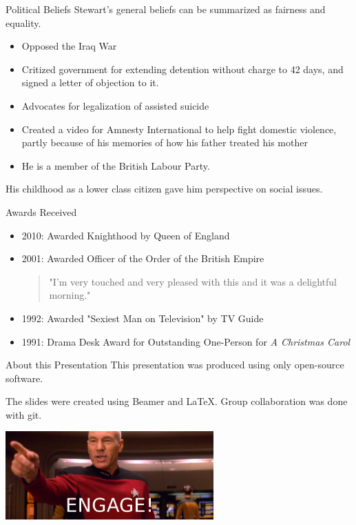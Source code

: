 \documentclass[xcolor=dvipsnames]{beamer}
\begin{document}
\begin{frame}{Political Beliefs}
  Stewart's general beliefs can be summarized as fairness and equality.  
  \begin{itemize}
    \item Opposed the Iraq War
    \item Critized government for extending detention without charge to 42
    days, and signed a letter of objection to it.
    \item Advocates for legalization of assisted suicide
    \item Created a video for Amnesty International to help fight domestic
    violence, partly because of his memories of how his father treated his
    mother
    \item He is a member of the British Labour Party.
  \end{itemize}
  His childhood as a lower class citizen gave him perspective on social issues.

\end{frame}

\begin{frame}{Awards Received}
  \begin{itemize}
    \item 2010: Awarded Knighthood by Queen of England
    \item 2001: Awarded Officer of the Order of the British Empire
      \begin{qct}
        \begin{quote}
          "I'm very touched and very pleased with this and it was a delightful
          morning."
        \end{quote}
      \end{qct}
    \item 1992: Awarded "Sexiest Man on Television" by TV Guide
    \item 1991: Drama Desk Award for Outstanding One-Person for \emph{A
    Christmas Carol}
  \end{itemize}
\end{frame}

\begin{frame}{About this Presentation}
  This presentation was produced using only open-source software.

  The slides were created using Beamer and LaTeX.
  Group collaboration was done with git.
  \begin{center}
    \includegraphics[width=0.6\textwidth]{engage.jpg}
  \end{center}
\end{frame}
\end{document}
